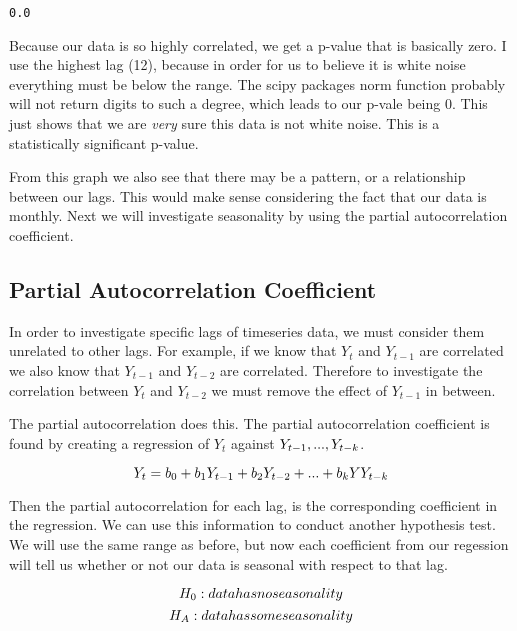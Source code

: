 \documentclass[11pt]{article}
\begin{document}
    \begin{Verbatim}[commandchars=\\\{\}]
0.0

    \end{Verbatim}

    Because our data is so highly correlated, we get a p-value that is
basically zero. I use the highest lag (12), because in order for us to
believe it is white noise everything must be below the range. The scipy
packages norm function probably will not return digits to such a degree,
which leads to our p-vale being 0. This just shows that we are
\emph{very} sure this data is not white noise. This is a statistically
significant p-value.

From this graph we also see that there may be a pattern, or a
relationship between our lags. This would make sense considering the
fact that our data is monthly. Next we will investigate seasonality by
using the partial autocorrelation coefficient.

    \subsection{Partial Autocorrelation
Coefficient}\label{partial-autocorrelation-coefficient}

    In order to investigate specific lags of timeseries data, we must
consider them unrelated to other lags. For example, if we know that
\(Y_t\) and \(Y_{t-1}\) are correlated we also know that \(Y_{t-1}\) and
\(Y_{t-2}\) are correlated. Therefore to investigate the correlation
between \(Y_{t}\) and \(Y_{t-2}\) we must remove the effect of
\(Y_{t-1}\) in between.

The partial autocorrelation does this. The partial autocorrelation
coefficient is found by creating a regression of \(Y_t\) against
\(Y_{t-1}, \space ..., \space Y_{t-k}\).

\[ Y_t \space = \space b_0 \space + \space b_1Y_{t-1} \space + \space b_2Y_{t-2} \space + \space ... \space + \space b_kYY_{t-k} \]

Then the partial autocorrelation for each lag, is the corresponding
coefficient in the regression. We can use this information to conduct
another hypothesis test. We will use the same range as before, but now
each coefficient from our regession will tell us whether or not our data
is seasonal with respect to that lag.

\[ H_{0} \space : data \space has \space no \space seasonality \]
\[ H_{A} \space : data \space has \space some \space seasonality \]
\end{document}
